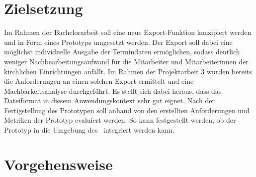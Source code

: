 \section{Zielsetzung} \label{zielsetzung}
Im Rahmen der Bachelorarbeit soll eine neue Export-Funktion konzipiert werden und in Form eines Prototyps umgesetzt werden. Der Export soll dabei eine möglichst individuelle Ausgabe der Termindaten ermöglichen, sodass deutlich weniger Nachbearbeitungsaufwand für die Mitarbeiter und Mitarbeiterinnen der kirchlichen Einrichtungen anfällt. Im Rahmen der Projektarbeit 3 wurden bereits die Anforderungen an einen solchen Export ermittelt und eine Machbarkeitsanalyse durchgeführt. Es stellt sich dabei heraus, dass das Dateiformat  in diesem Anwendungskontext sehr gut eignet. \abschnitt
Nach der Fertigstellung des Prototypen soll anhand von den erstellten Anforderungen und Metriken der Prototyp evaluiert werden. So kann festgestellt werden, ob der Prototyp in die Umgebung des \cmsEdith \, integriert werden kann.


\section{Vorgehensweise} \label{vorgehensweise}
